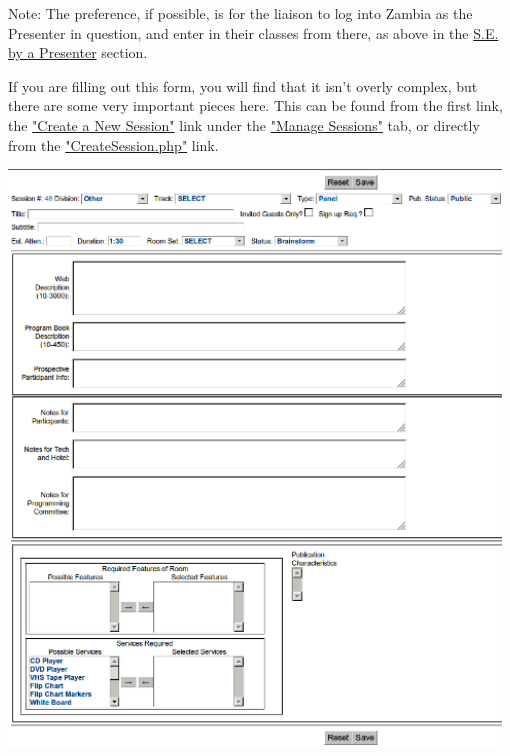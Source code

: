 \documentclass[captions=tablesignature]{scrartcl}
\begin{document}
Note: The preference, if possible, is for the liaison to log into
Zambia as the Presenter in question, and enter in their classes
from there, as above in the \hyperref[sec-5-2]{S.E. by a Presenter} section.

If you are filling out this form, you will find that it isn't
overly complex, but there are some very important pieces here.
This can be found from the first link, the \href{../webpages/CreateSession.php}{"Create a New Session"}
link under the \href{../webpages/StaffManageSessions.php}{"Manage Sessions"} tab, or directly from the
 \href{../webpages/CreateSession.php}{"CreateSession.php"} link.

\includegraphics[width=0.98\textwidth]{./Images/Add_New_Session.png}
\end{document}
